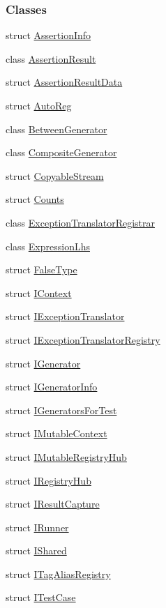 \subsubsection*{Classes}
\begin{DoxyCompactItemize}
\item 
struct \hyperlink{a00004}{Assertion\+Info}
\item 
class \hyperlink{a00005}{Assertion\+Result}
\item 
struct \hyperlink{a00006}{Assertion\+Result\+Data}
\item 
struct \hyperlink{a00007}{Auto\+Reg}
\item 
class \hyperlink{a00008}{Between\+Generator}
\item 
class \hyperlink{a00012}{Composite\+Generator}
\item 
struct \hyperlink{a00014}{Copyable\+Stream}
\item 
struct \hyperlink{a00015}{Counts}
\item 
class \hyperlink{a00027}{Exception\+Translator\+Registrar}
\item 
class \hyperlink{a00028}{Expression\+Lhs}
\item 
struct \hyperlink{a00029}{False\+Type}
\item 
struct \hyperlink{a00031}{I\+Context}
\item 
struct \hyperlink{a00032}{I\+Exception\+Translator}
\item 
struct \hyperlink{a00033}{I\+Exception\+Translator\+Registry}
\item 
struct \hyperlink{a00034}{I\+Generator}
\item 
struct \hyperlink{a00035}{I\+Generator\+Info}
\item 
struct \hyperlink{a00036}{I\+Generators\+For\+Test}
\item 
struct \hyperlink{a00037}{I\+Mutable\+Context}
\item 
struct \hyperlink{a00038}{I\+Mutable\+Registry\+Hub}
\item 
struct \hyperlink{a00039}{I\+Registry\+Hub}
\item 
struct \hyperlink{a00040}{I\+Result\+Capture}
\item 
struct \hyperlink{a00041}{I\+Runner}
\item 
struct \hyperlink{a00042}{I\+Shared}
\item 
struct \hyperlink{a00044}{I\+Tag\+Alias\+Registry}
\item 
struct \hyperlink{a00045}{I\+Test\+Case}
\item 

\end{DoxyCompactItemize}

